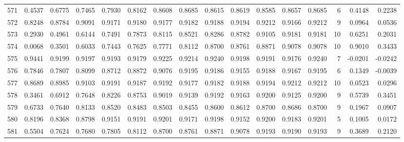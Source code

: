\begin{tabular}{lrrrrrrrrrrrrrrr}
571 &      0.4537 &  0.6775 &  0.7465 &  0.7930 &  0.8162 &  0.8608 &  0.8685 &  0.8615 &  0.8619 &  0.8585 &   0.8657 &     0.8685 &      6 &                    0.4148 &                     0.2238 \\
572 &      0.8248 &  0.8784 &  0.9091 &  0.9171 &  0.9180 &  0.9177 &  0.9182 &  0.9188 &  0.9194 &  0.9212 &   0.9166 &     0.9212 &      9 &                    0.0964 &                     0.0536 \\
573 &      0.2930 &  0.4961 &  0.6144 &  0.7491 &  0.7873 &  0.8115 &  0.8521 &  0.8286 &  0.8782 &  0.9105 &   0.9181 &     0.9181 &     10 &                    0.6251 &                     0.2031 \\
574 &      0.0068 &  0.3501 &  0.6033 &  0.7443 &  0.7625 &  0.7771 &  0.8112 &  0.8700 &  0.8761 &  0.8871 &   0.9078 &     0.9078 &     10 &                    0.9010 &                     0.3433 \\
575 &      0.9441 &  0.9199 &  0.9197 &  0.9193 &  0.9179 &  0.9225 &  0.9214 &  0.9240 &  0.9198 &  0.9191 &   0.9176 &     0.9240 &      7 &                   -0.0201 &                    -0.0242 \\
576 &      0.7846 &  0.7807 &  0.8099 &  0.8712 &  0.8872 &  0.9076 &  0.9195 &  0.9186 &  0.9155 &  0.9188 &   0.9167 &     0.9195 &      6 &                    0.1349 &                    -0.0039 \\
577 &      0.8689 &  0.8985 &  0.9103 &  0.9191 &  0.9187 &  0.9192 &  0.9177 &  0.9182 &  0.9188 &  0.9194 &   0.9212 &     0.9212 &     10 &                    0.0523 &                     0.0296 \\
578 &      0.3461 &  0.6912 &  0.7648 &  0.8226 &  0.8753 &  0.9019 &  0.9139 &  0.9192 &  0.9163 &  0.9200 &   0.9125 &     0.9200 &      9 &                    0.5739 &                     0.3451 \\
579 &      0.6733 &  0.7640 &  0.8133 &  0.8520 &  0.8483 &  0.8503 &  0.8455 &  0.8600 &  0.8612 &  0.8700 &   0.8686 &     0.8700 &      9 &                    0.1967 &                     0.0907 \\
580 &      0.8196 &  0.8368 &  0.8798 &  0.9151 &  0.9191 &  0.9201 &  0.9171 &  0.9198 &  0.9152 &  0.9200 &   0.9183 &     0.9201 &      5 &                    0.1005 &                     0.0172 \\
581 &      0.5504 &  0.7624 &  0.7680 &  0.7805 &  0.8112 &  0.8700 &  0.8761 &  0.8871 &  0.9078 &  0.9193 &   0.9190 &     0.9193 &      9 &                    0.3689 &                     0.2120 \\

\end{tabular}
